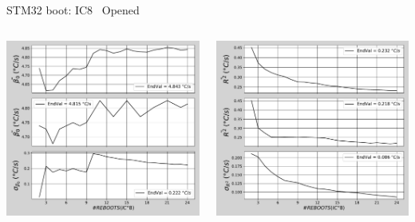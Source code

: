 \begin{frame}{STM32 boot: IC8 \textrightarrow\ Opened}
	\vspace{5mm}
	\begin{columns}
		\begin{column}{0.5\textwidth}
			\includegraphics[width=1.0\textwidth]{./figures/flistCircuit8_25_sl30beta0.pdf}
		\end{column}
		\begin{column}{0.5\textwidth}
			\includegraphics[width=1.0\textwidth]{./figures/flistCircuit8_25_sl30r2.pdf}
		\end{column}
	\end{columns}
\end{frame}

